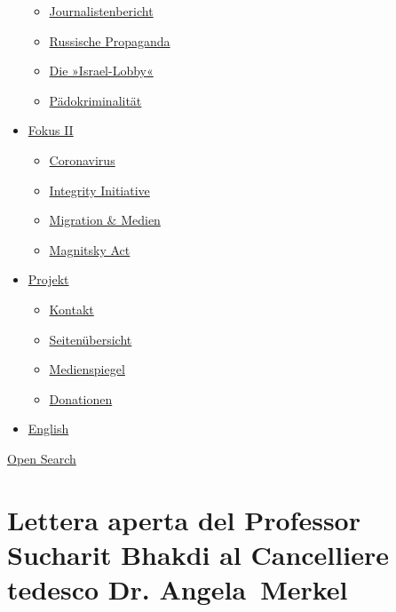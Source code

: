 \begin{itemize}
  \begin{itemize}
  \tightlist
  \item
    \href{https://swprs.org/bericht-eines-journalisten/}{Journalistenbericht}
  \item
    \href{https://swprs.org/russische-propaganda/}{Russische Propaganda}
  \item
    \href{https://swprs.org/die-israel-lobby-fakten-und-mythen/}{Die
    »Israel-Lobby«}
  \item
    \href{https://swprs.org/geopolitik-und-paedokriminalitaet/}{Pädokriminalität}
  \end{itemize}
\item
  \href{https://swprs.org/migration-und-medien/}{Fokus II}

  \begin{itemize}
  \tightlist
  \item
    \href{https://swprs.org/covid-19-hinweis-ii/}{Coronavirus}
  \item
    \href{https://swprs.org/die-integrity-initiative/}{Integrity
    Initiative}
  \item
    \href{https://swprs.org/migration-und-medien/}{Migration \& Medien}
  \item
    \href{https://swprs.org/der-fall-magnitsky/}{Magnitsky Act}
  \end{itemize}
\item
  \href{https://swprs.org/kontakt/}{Projekt}

  \begin{itemize}
  \tightlist
  \item
    \href{https://swprs.org/kontakt/}{Kontakt}
  \item
    \href{https://swprs.org/uebersicht/}{Seitenübersicht}
  \item
    \href{https://swprs.org/medienspiegel/}{Medienspiegel}
  \item
    \href{https://swprs.org/donationen/}{Donationen}
  \end{itemize}
\item
  \href{https://swprs.org/contact/}{English}
\end{itemize}

\protect\hyperlink{}{Open Search}

\hypertarget{lettera-aperta-del-professor-sucharit-bhakdi-al-cancelliere-tedesco-dr-angela-merkel}{%
\section{Lettera aperta del Professor Sucharit Bhakdi al Cancelliere
tedesco Dr.
Angela~Merkel}\label{lettera-aperta-del-professor-sucharit-bhakdi-al-cancelliere-tedesco-dr-angela-merkel}}

